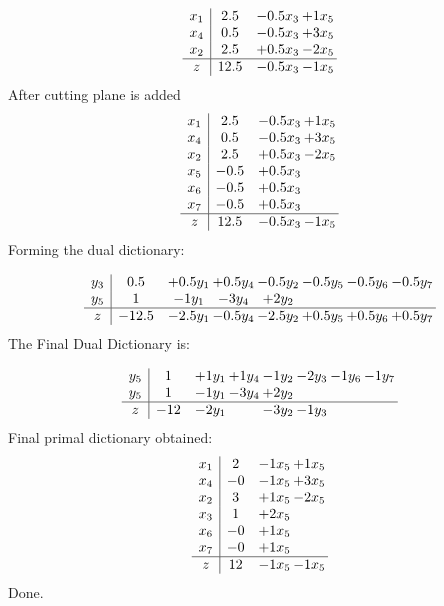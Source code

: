 \documentclass[11pt]{article}
\begin{document}
\[\begin{array}{c| c c@{\hskip 2pt} c@{\hskip 2pt} }
 x_{1}   &  2.5 & -0.5 x_{3} & + 1 x_{5}\\
 x_{4}   &  0.5 & -0.5 x_{3} & + 3 x_{5}\\
 x_{2}   &  2.5 & + 0.5 x_{3} & -2 x_{5}\\
\hline
z    &  12.5 & -0.5 x_{3} & -1 x_{5}\\
\end{array}\]
 After cutting plane is added 
\[\begin{array}{c| c c@{\hskip 2pt} c@{\hskip 2pt} }
 x_{1}   &  2.5 & -0.5 x_{3} & + 1 x_{5}\\
 x_{4}   &  0.5 & -0.5 x_{3} & + 3 x_{5}\\
 x_{2}   &  2.5 & + 0.5 x_{3} & -2 x_{5}\\
 x_{5}   &  -0.5 & + 0.5 x_{3} &   \\
 x_{6}   &  -0.5 & + 0.5 x_{3} &   \\
 x_{7}   &  -0.5 & + 0.5 x_{3} &   \\
\hline
z    &  12.5 & -0.5 x_{3} & -1 x_{5}\\
\end{array}\]
Forming the dual dictionary:

\[\begin{array}{c| c c@{\hskip 2pt} c@{\hskip 2pt} c@{\hskip 2pt} c@{\hskip 2pt} c@{\hskip 2pt} c@{\hskip 2pt} }
 y_{3}   &  0.5 & + 0.5 y_{1} & + 0.5 y_{4} & -0.5 y_{2} & -0.5 y_{5} & -0.5 y_{6} & -0.5 y_{7}\\
 y_{5}   &  1 & -1 y_{1} & -3 y_{4} & + 2 y_{2} &    &    &   \\
\hline
z    &  -12.5 & -2.5 y_{1} & -0.5 y_{4} & -2.5 y_{2} & + 0.5 y_{5} & + 0.5 y_{6} & + 0.5 y_{7}\\
\end{array}\]
The Final Dual Dictionary is: 

\[\begin{array}{c| c c@{\hskip 2pt} c@{\hskip 2pt} c@{\hskip 2pt} c@{\hskip 2pt} c@{\hskip 2pt} c@{\hskip 2pt} }
 y_{5}   &  1 & + 1 y_{1} & + 1 y_{4} & -1 y_{2} & -2 y_{3} & -1 y_{6} & -1 y_{7}\\
 y_{5}   &  1 & -1 y_{1} & -3 y_{4} & + 2 y_{2} &    &    &   \\
\hline
z    &  -12 & -2 y_{1} &   & -3 y_{2} & -1 y_{3} &    &   \\
\end{array}\]
 Final primal dictionary obtained: 
\[\begin{array}{c| c c@{\hskip 2pt} c@{\hskip 2pt} }
 x_{1}   &  2 & -1 x_{5} & + 1 x_{5}\\
 x_{4}   &  -0 & -1 x_{5} & + 3 x_{5}\\
 x_{2}   &  3 & + 1 x_{5} & -2 x_{5}\\
 x_{3}   &  1 & + 2 x_{5} &   \\
 x_{6}   &  -0 & + 1 x_{5} &   \\
 x_{7}   &  -0 & + 1 x_{5} &   \\
\hline
z    &  12 & -1 x_{5} & -1 x_{5}\\
\end{array}\]
Done.
\end{document}
